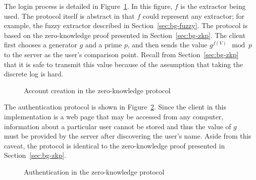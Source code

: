 \documentclass[11pt]{article}
\begin{document}
The login process is detailed in Figure~\ref{fig:zk_new}. In this figure, $f$ is the extractor being used. The protocol itself is abstract in that $f$ could represent any extractor; for example, the fuzzy extractor described in Section~\ref{sec:bg-fuzzy}. The protocol is based on the zero-knowledge proof presented in Section~\ref{sec:bg-zkp}. The client first chooses a generator $g$ and a prime $p$, and then sends the value $g^{f(V)}\mod p$ to the server as the user's comparison point. Recall from Section~\ref{sec:bg-zkp} that it is safe to transmit this value because of the assumption that taking the discrete log is hard.

\begin{figure}[h!]
\centering
{}
\caption{Account creation in the zero-knowledge protocol}
\label{fig:zk_new}
\end{figure}

The authentication protocol is shown in Figure~\ref{fig:zk_auth}. Since the client in this implementation is a web page that may be accessed from any computer, information about a particular user cannot be stored and thus the value of $g$ must be provided by the server after discovering the user's name. Aside from this caveat, the protocol is identical to the zero-knowledge proof presented in Section~\ref{sec:bg-zkp}.

\begin{figure}[h!]
\centering
{}
\caption{Authentication in the zero-knowledge protocol}
\label{fig:zk_auth}
\end{figure}
\end{document}

